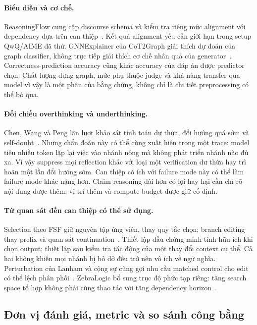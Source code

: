 \paragraph{Biểu diễn và cơ chế.}
ReasoningFlow cung cấp discourse schema và kiểm tra riêng mức alignment với dependency dựa trên can thiệp~\cite{rra3_reasoningflow}. Kết quả alignment yếu cần giới hạn trong setup QwQ/AIME đã thử. GNNExplainer của CoT2Graph giải thích dự đoán của graph classifier, không trực tiếp giải thích cơ chế nhân quả của generator~\cite{rra3_cot2graph}. Correctness-prediction accuracy cũng khác accuracy của đáp án được predictor chọn. Chất lượng dựng graph, mức phụ thuộc judge và khả năng transfer qua model vì vậy là một phần của bằng chứng, không chỉ là chi tiết preprocessing có thể bỏ qua.

\paragraph{Đối chiếu overthinking và underthinking.}
Chen, Wang và Peng lần lượt khảo sát tính toán dư thừa, đổi hướng quá sớm và self-doubt~\cite{rra3_chen_overthinking,rra3_underthinking,rra3_overthinking}. Những chẩn đoán này có thể cùng xuất hiện trong một trace: model tiêu nhiều token lặp lại việc vào nhánh nông mà không phát triển nhánh nào đủ xa. Vì vậy suppress mọi reflection khác với loại một verification dư thừa hay trì hoãn một lần đổi hướng sớm. Can thiệp có ích với failure mode này có thể làm failure mode khác nặng hơn. Claim reasoning dài hơn có lợi hay hại cần chỉ rõ nội dung được thêm, vị trí thêm và compute budget được giữ cố định.

\paragraph{Từ quan sát đến can thiệp có thể sử dụng.}
Selection theo FSF giữ nguyên tập ứng viên, thay quy tắc chọn; branch editing thay prefix và quan sát continuation~\cite{rra3_effective_reasoning}. Thiết lập đầu chứng minh tính hữu ích khi chọn output; thiết lập sau kiểm tra tác động của một thay đổi context cụ thể. Cả hai không khiến mọi nhánh bị bỏ dở đều trở nên vô ích về ngữ nghĩa. Perturbation của Lanham và cộng sự cũng gợi nhu cầu matched control cho edit có thể lệch phân phối~\cite{rra3_lanham_faithfulness}. ZebraLogic bổ sung trục độ phức tạp riêng: tăng search space tổ hợp không phải cùng thao tác với tăng dependency horizon~\cite{rra3_zebralogic}.

\subsection{Đơn vị đánh giá, metric và so sánh công bằng}
\label{subsec:a4_protocol}

